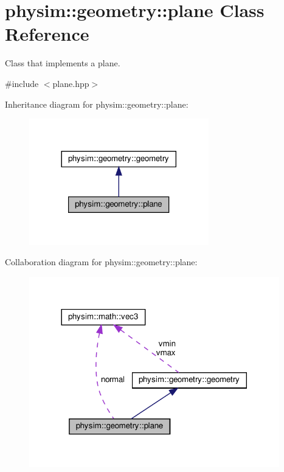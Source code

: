 \hypertarget{classphysim_1_1geometry_1_1plane}{}\section{physim\+:\+:geometry\+:\+:plane Class Reference}
\label{classphysim_1_1geometry_1_1plane}


Class that implements a plane.  




{\ttfamily \#include $<$plane.\+hpp$>$}



Inheritance diagram for physim\+:\+:geometry\+:\+:plane\+:\nopagebreak
\begin{figure}[H]
\begin{center}
\leavevmode
\includegraphics[width=221pt]{classphysim_1_1geometry_1_1plane__inherit__graph}
\end{center}
\end{figure}


Collaboration diagram for physim\+:\+:geometry\+:\+:plane\+:
\nopagebreak
\begin{figure}[H]
\begin{center}
\leavevmode
\includegraphics[width=308pt]{classphysim_1_1geometry_1_1plane__coll__graph}
\end{center}
\end{figure}
